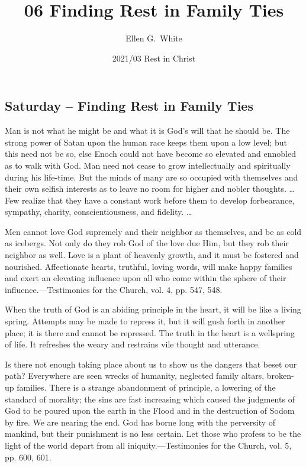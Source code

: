 \documentclass[a4paper, 10pt, twoside, headings=small]{scrartcl}
\title{06 Finding Rest in Family Ties}
\author{Ellen G.\ White}
\date{2021/03 Rest in Christ}
\begin{document}
\maketitle

\thispagestyle{empty}

\pagestyle{fancy}

\begin{multicols}{2}

\section*{Saturday – Finding Rest in Family Ties}

Man is not what he might be and what it is God’s will that he should be. The strong power of Satan upon the human race keeps them upon a low level; but this need not be so, else Enoch could not have become so elevated and ennobled as to walk with God. Man need not cease to grow intellectually and spiritually during his life-time. But the minds of many are so occupied with themselves and their own selfish interests as to leave no room for higher and nobler thoughts. … Few realize that they have a constant work before them to develop forbearance, sympathy, charity, conscientiousness, and fidelity. …

Men cannot love God supremely and their neighbor as themselves, and be as cold as icebergs. Not only do they rob God of the love due Him, but they rob their neighbor as well. Love is a plant of heavenly growth, and it must be fostered and nourished. Affectionate hearts, truthful, loving words, will make happy families and exert an elevating influence upon all who come within the sphere of their influence.—Testimonies for the Church, vol. 4, pp. 547, 548.

When the truth of God is an abiding principle in the heart, it will be like a living spring. Attempts may be made to repress it, but it will gush forth in another place; it is there and cannot be repressed. The truth in the heart is a wellspring of life. It refreshes the weary and restrains vile thought and utterance.

Is there not enough taking place about us to show us the dangers that beset our path? Everywhere are seen wrecks of humanity, neglected family altars, broken-up families. There is a strange abandonment of principle, a lowering of the standard of morality; the sins are fast increasing which caused the judgments of God to be poured upon the earth in the Flood and in the destruction of Sodom by fire. We are nearing the end. God has borne long with the perversity of mankind, but their punishment is no less certain. Let those who profess to be the light of the world depart from all iniquity.—Testimonies for the Church, vol. 5, pp. 600, 601.


\end{multicols}
\end{document}
